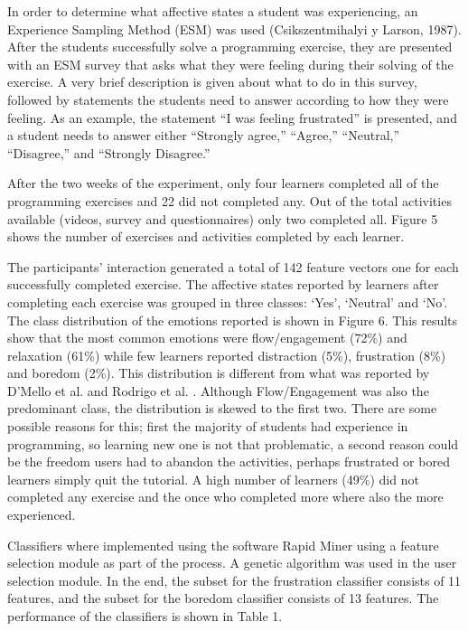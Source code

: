 \documentclass[conference]{IEEEtran}
\begin{document}
In order to determine what affective states a student was experiencing, an
Experience Sampling Method (ESM) was used (Csikszentmihalyi y Larson, 1987).
After the students successfully solve a programming exercise, they are presented
with an ESM survey that asks what they were feeling during their solving of the
exercise. A very brief description is given about what to do in this survey,
followed by statements the students need to answer according to how they were
feeling. As an example, the statement “I was feeling frustrated” is presented,
and a student needs to answer either “Strongly agree,” “Agree,” “Neutral,”
“Disagree,” and “Strongly Disagree.”

After the two weeks of the experiment, only four learners completed all of the
programming exercises and 22 did not completed any. Out of the total activities
available (videos, survey and questionnaires) only two completed all. Figure 5
shows the number of exercises and activities completed by each learner.
  
The participants' interaction generated a total of 142 feature vectors one for each
successfully completed exercise. The affective states reported by learners after
completing each exercise was grouped in three classes: ‘Yes’, ‘Neutral’ and
‘No’. The class distribution of the emotions reported is shown in Figure 6. This
results show that the most common emotions were flow/engagement (72\%) and
relaxation (61\%) while few learners reported distraction (5\%), frustration
(8\%) and boredom (2\%). This distribution is different from what was reported
by D’Mello et al. \cite{bixler2013detecting} and Rodrigo et al. \cite{rodrigo2009affective}.
Although Flow/Engagement was
also the predominant class, the distribution is skewed to the first two. There
are some possible reasons for this; first the majority of students had
experience in programming, so learning new one is not that problematic, a second
reason could be the freedom users had to abandon the activities, perhaps
frustrated or bored learners simply quit the tutorial. A high number of learners
(49\%) did not completed any exercise and the once who completed more where also
the more experienced.

Classifiers where implemented using the software Rapid Miner using a feature
selection module as part of the process. A genetic algorithm was used in the
user selection module. In the end, the subset for the frustration classifier
consists of 11 features, and the subset for the boredom classifier consists of
13 features. The performance of the classifiers is shown in Table 1. 
\end{document}
